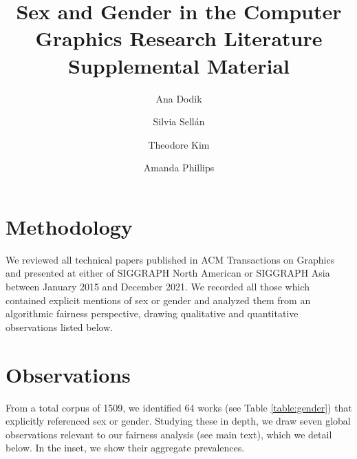 \documentclass[nonacm,sigconf,balance=false]{acmart}
\begin{document}
\title{Sex and Gender in the Computer Graphics Research Literature \\
\Large{Supplemental Material}}

\author{Ana Dodik}

\author{Silvia Sellán}\authornotemark[1]

\author{Theodore Kim}

\author{Amanda Phillips}



\maketitle

\section{Methodology}

We reviewed all technical papers published in ACM Transactions on Graphics and
presented at either of SIGGRAPH North American or SIGGRAPH Asia between
January 2015 and December 2021. We recorded all those which contained
explicit mentions of sex or gender and analyzed them from an algorithmic fairness perspective, drawing qualitative and quantitative observations listed below.

\section{Observations}

From a total corpus of 1509, we identified 64 works (see Table \ref{table:gender}) that explicitly referenced sex or gender. Studying these in depth, we draw seven global observations relevant to our fairness analysis (see main text), which we detail below. In the inset, we show their aggregate prevalences. 
\end{document}
